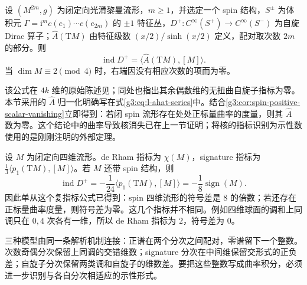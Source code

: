 \begin{theorem}\label{g3:thm:spin-ahat-index}
	设 \((M^{2m},g)\) 为闭定向光滑黎曼流形，\(m\ge1\)，并选定一个 spin 结构，\(S^\pm\) 为体积元 \(\Gamma=\mathrm i^m c(e_1)\cdots c(e_{2m})\) 的 \(\pm1\) 特征丛，\(D^+:C^\infty(S^+)\to C^\infty(S^-)\) 为自旋 Dirac 算子；\(\widehat A(\mathrm TM)\) 由特征级数 \((x/2)/\sinh(x/2)\) 定义，配对取次数 \(2m\) 的部分。则
	\begin{equation}\label{g3:eq:spin-ahat-index}
		\operatorname{ind}D^+
		=\langle\widehat A(\mathrm TM),[M]\rangle.
	\end{equation}
	当 \(\dim M\equiv2\pmod4\) 时，右端因没有相应次数的项而为零。
\end{theorem}

该公式在 \(4k\) 维的原始陈述见\cite[第5节，式(5.2)及定理(5.3)，第570--571页]{AtiyahSinger1968III}；同处也指出其余偶数维的无扭曲自旋子指标为零。本节采用的 \(\widehat A\) 归一化明确写在式\eqref{g3:eq:l-ahat-series}中。结合\cref{g3:cor:spin-positive-scalar-vanishing}立即得到：若闭 spin 流形存在处处正标量曲率的度量，则其 \(\widehat A\) 数为零。这个结论中的曲率导致核消失已在上一节证明；将核的指标识别为示性数使用的是刚刚注明的外部定理。

\begin{example}\label{g3:exm:four-dimensional-indices}
	设 \(M\) 为闭定向四维流形。de Rham 指标为 \(\chi(M)\)，signature 指标为
	\(\frac13\langle p_1(\mathrm TM),[M]\rangle\)。若 \(M\) 还带 spin 结构，则
	\[
		\operatorname{ind}D^+
		=-\frac1{24}\langle p_1(\mathrm TM),[M]\rangle
		=-\frac18\operatorname{sign}(M).
	\]
	因此单从这个复指标公式已得到：spin 四维流形的符号差是 \(8\) 的倍数；若还存在正标量曲率度量，则符号差为零。这几个指标并不相同。例如四维球面的调和上同调只在 \(0,4\) 次各有一维，所以 de Rham 指标为 \(2\)，符号差为 \(0\)。
\end{example}

三种模型由同一条解析机制连接：正谱在两个分次之间配对，零谱留下一个整数。次数奇偶分次保留上同调的交错维数；signature 分次在中间维保留交形式的正负差；自旋子分次保留两类调和自旋子的维数差。要把这些整数写成曲率积分，必须进一步识别与各自分次相适应的示性形式。
